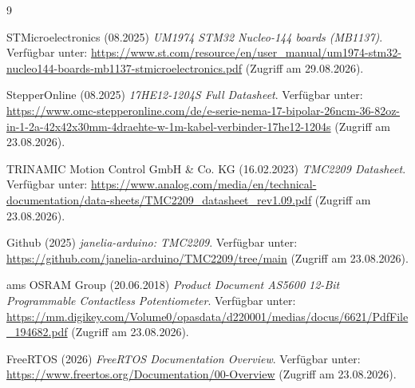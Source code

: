 \begin{thebibliography}{9}



STMicroelectronics (08.2025) \emph{UM1974 STM32 Nucleo-144 boards (MB1137)}. Verfügbar unter: \url{https://www.st.com/resource/en/user_manual/um1974-stm32-nucleo144-boards-mb1137-stmicroelectronics.pdf} (Zugriff am 29.08.2026).

StepperOnline (08.2025) \emph{17HE12-1204S Full Datasheet}. Verfügbar unter: \url{https://www.omc-stepperonline.com/de/e-serie-nema-17-bipolar-26ncm-36-82oz-in-1-2a-42x42x30mm-4draehte-w-1m-kabel-verbinder-17he12-1204s} (Zugriff am 23.08.2026).

TRINAMIC Motion Control GmbH \& Co. KG (16.02.2023) \emph{TMC2209 Datasheet}. Verfügbar unter: \url{https://www.analog.com/media/en/technical-documentation/data-sheets/TMC2209_datasheet_rev1.09.pdf} (Zugriff am 23.08.2026).

Github (2025) \emph{janelia-arduino: TMC2209}. Verfügbar unter: \url{https://github.com/janelia-arduino/TMC2209/tree/main} (Zugriff am 23.08.2026).

ams OSRAM Group (20.06.2018) \emph{Product Document AS5600 12-Bit Programmable Contactless Potentiometer}. Verfügbar unter: \url{https://mm.digikey.com/Volume0/opasdata/d220001/medias/docus/6621/PdfFile_194682.pdf} (Zugriff am 23.08.2026).

FreeRTOS (2026) \emph{FreeRTOS Documentation Overview}. Verfügbar unter: \url{https://www.freertos.org/Documentation/00-Overview} (Zugriff am 23.08.2026).





\end{thebibliography}